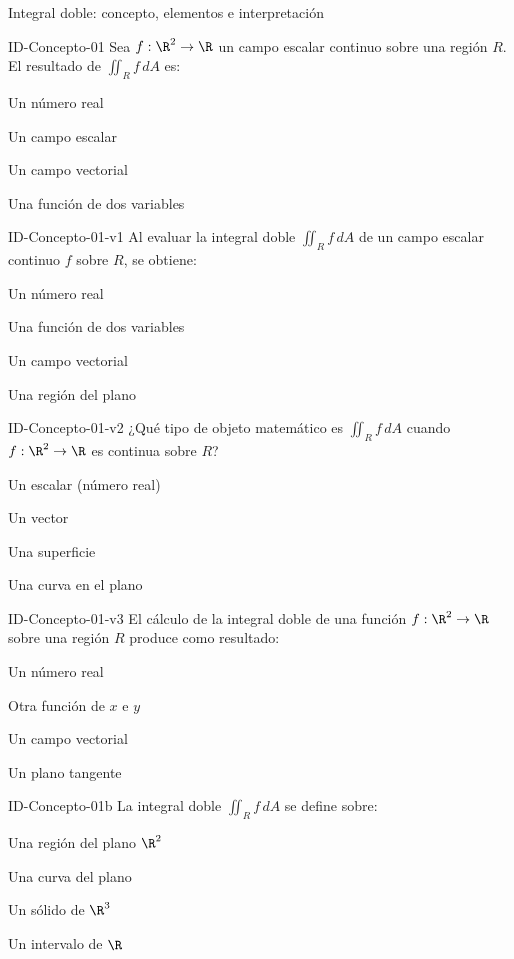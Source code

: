 \documentclass[a4,11pt]{aleph-notas}
\begin{document}
\begin{quiz}{Integral doble: concepto, elementos e interpretación}

\begin{multi}[]%
    {ID-Concepto-01}
    Sea $f:\R^2\to\R$ un campo escalar continuo sobre una región $R$. El resultado de $\displaystyle\iint_R f\,dA$ es:
    \item* Un número real
    \item Un campo escalar
    \item Un campo vectorial
    \item Una función de dos variables
\end{multi}

\begin{multi}[]%
    {ID-Concepto-01-v1}
    Al evaluar la integral doble $\displaystyle\iint_R f\,dA$ de un campo escalar continuo $f$ sobre $R$, se obtiene:
    \item* Un número real
    \item Una función de dos variables
    \item Un campo vectorial
    \item Una región del plano
\end{multi}

\begin{multi}[]%
    {ID-Concepto-01-v2}
    ¿Qué tipo de objeto matemático es $\displaystyle\iint_R f\,dA$ cuando $f:\R^2\to\R$ es continua sobre $R$?
    \item* Un escalar (número real)
    \item Un vector
    \item Una superficie
    \item Una curva en el plano
\end{multi}

\begin{multi}[]%
    {ID-Concepto-01-v3}
    El cálculo de la integral doble de una función $f:\R^2\to\R$ sobre una región $R$ produce como resultado:
    \item* Un número real
    \item Otra función de $x$ e $y$
    \item Un campo vectorial
    \item Un plano tangente
\end{multi}

\begin{multi}[]%
    {ID-Concepto-01b}
    La integral doble $\displaystyle\iint_R f\,dA$ se define sobre:
    \item* Una región del plano $\R^2$
    \item Una curva del plano
    \item Un sólido de $\R^3$
    \item Un intervalo de $\R$
\end{multi}


\end{quiz}
\end{document}
